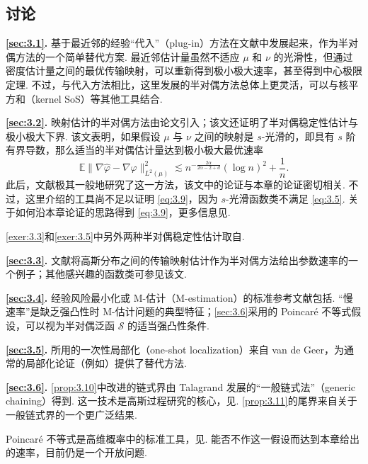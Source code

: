 \subsection{讨论}\label{sec:3.7}
\noindent\textbf{\autoref{sec:3.1}.} 基于最近邻的经验“代入”（plug-in）方法在文献\cite{ref104,ref147,ref221}中发展起来，作为半对偶方法的一个简单替代方案. 最近邻估计量虽然不适应 $\mu$ 和 $\nu$ 的光滑性，但通过密度估计量之间的最优传输映射，可以重新得到极小极大速率\cite{ref221}，甚至得到中心极限定理\cite{ref223}. 不过，与代入方法相比，这里发展的半对偶方法总体上更灵活，可以与核平方和（kernel SoS）等其他工具结合\cite{ref305}.

\noindent\textbf{\autoref{sec:3.2}.} 映射估计的半对偶方法由论文\cite{ref166}引入；该文还证明了半对偶稳定性估计与极小极大下界. 该文表明，如果假设 $\mu$ 与 $\nu$ 之间的映射是 $s$-光滑的，即具有 $s$ 阶有界导数，那么适当的半对偶估计量达到极小极大最优速率
\begin{equation}\label{eq:3.9}
\mathbb E\|\nabla\widehat\varphi-\nabla\varphi\|_{L^2(\mu)}^2
\lesssim n^{-\frac{2\alpha}{2\alpha-2+d}}(\log n)^2+\frac1n.
\end{equation}
此后，文献\cite{ref112}极其一般地研究了这一方法，该文中的论证与本章的论证密切相关. 不过，这里介绍的工具尚不足以证明 \eqref{eq:3.9}，因为 $s$-光滑函数类不满足 \eqref{eq:3.5}. 关于如何沿本章论证的思路得到 \eqref{eq:3.9}，更多信息见\cite[第4.4节]{ref112}.

\autoref{exer:3.3}和\autoref{exer:3.5}中另外两种半对偶稳定性估计取自\cite{ref221}.

\noindent\textbf{\autoref{sec:3.3}.} 文献\cite{ref112}将高斯分布之间的传输映射估计作为半对偶方法给出参数速率的一个例子；其他感兴趣的函数类可参见该文.

\noindent\textbf{\autoref{sec:3.4}.} 经验风险最小化或 M-估计（M-estimation）的标准参考文献包括\cite{ref308,ref318}. “慢速率”是缺乏强凸性时 M-估计问题的典型特征；\autoref{sec:3.6}采用的 Poincar\'e 不等式假设，可以视为半对偶泛函 $\mathcal S$ 的适当强凸性条件.

\noindent\textbf{\autoref{sec:3.5}.} 所用的一次性局部化（one-shot localization）来自 van de Geer\cite{ref306,ref307}，为通常的局部化论证（例如\cite[第14章]{ref318}）提供了替代方法.

\noindent\textbf{\autoref{sec:3.6}.} \autoref{prop:3.10}中改进的链式界由 Talagrand 发展的“一般链式法”（generic chaining）\cite{ref298}得到. 这一技术是高斯过程研究的核心，见\cite{ref299}. \autoref{prop:3.11}的尾界来自关于一般链式界的一个更广泛结果\cite[定理2.2.19]{ref309}.

Poincar\'e 不等式是高维概率中的标准工具，见\cite{ref30,ref51,ref310}. 能否不作这一假设而达到本章给出的速率，目前仍是一个开放问题.

